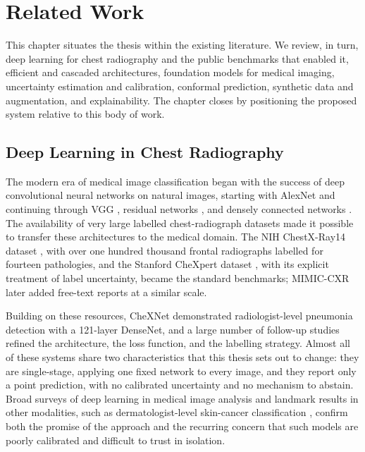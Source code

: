 \chapter{Related Work}
\label{ch:related_work}

This chapter situates the thesis within the existing literature. We review, in turn, deep learning for chest radiography and the public benchmarks that enabled it, efficient and cascaded architectures, foundation models for medical imaging, uncertainty estimation and calibration, conformal prediction, synthetic data and augmentation, and explainability. The chapter closes by positioning the proposed system relative to this body of work.

\section{Deep Learning in Chest Radiography}
The modern era of medical image classification began with the success of deep convolutional neural networks on natural images, starting with AlexNet \cite{krizhevsky2012imagenet} and continuing through VGG \cite{simonyan2015very}, residual networks \cite{he2016deep}, and densely connected networks \cite{huang2017densely}. The availability of very large labelled chest-radiograph datasets made it possible to transfer these architectures to the medical domain. The NIH ChestX-Ray14 dataset \cite{wang2017chestxray}, with over one hundred thousand frontal radiographs labelled for fourteen pathologies, and the Stanford CheXpert dataset \cite{irvin2019chexpert}, with its explicit treatment of label uncertainty, became the standard benchmarks; MIMIC-CXR \cite{johnson2019mimic} later added free-text reports at a similar scale.

Building on these resources, CheXNet \cite{rajpurkar2017chexnet} demonstrated radiologist-level pneumonia detection with a 121-layer DenseNet, and a large number of follow-up studies refined the architecture, the loss function, and the labelling strategy. Almost all of these systems share two characteristics that this thesis sets out to change: they are single-stage, applying one fixed network to every image, and they report only a point prediction, with no calibrated uncertainty and no mechanism to abstain. Broad surveys of deep learning in medical image analysis \cite{litjens2017survey} and landmark results in other modalities, such as dermatologist-level skin-cancer classification \cite{esteva2017dermatologist}, confirm both the promise of the approach and the recurring concern that such models are poorly calibrated and difficult to trust in isolation.

